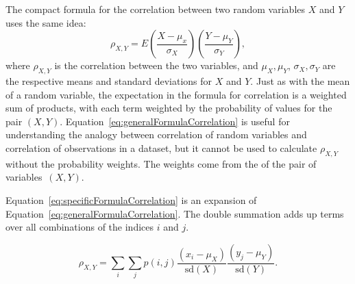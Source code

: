 The compact formula for the correlation between two random variables $X$ and $Y$  uses the same idea:
\begin{equation}
\rho_{X,Y} = E\left(\frac{X - \mu_x}{\sigma_X}\right)\left(\frac{Y - \mu_Y}{\sigma_Y} \right),
\label{eq:generalFormulaCorrelation}
\end{equation}
where $\rho_{X,Y}$ is the correlation between the two variables, and $\mu_X, \mu_Y$, $\sigma_X, \sigma_Y$ are the respective means and standard deviations for $X$ and $Y$. Just as with the mean of a random variable, the expectation in the formula for correlation is a weighted sum of products, with each term weighted by the probability of values for the pair $(X,Y)$.  Equation~\ref{eq:generalFormulaCorrelation} is useful for understanding the analogy between correlation of random variables and correlation of observations in a dataset, but it cannot be used to calculate $\rho_{X,Y}$ without the probability weights.  The weights come from the  of the pair of variables~$(X,Y)$. 

Equation~\ref{eq:specificFormulaCorrelation} is an expansion of Equation~\ref{eq:generalFormulaCorrelation}. The double summation adds up terms over all combinations of the indices $i$ and $j$.

\begin{equation}
\rho_{X,Y} = \sum_{i} \sum_{j} p(i,j)\frac{(x_i - \mu_X)}{\textrm{sd}(X)}\frac{(y_j - \mu_Y)}{\textrm{sd}(Y)}.
\label{eq:specificFormulaCorrelation}
\end{equation}



